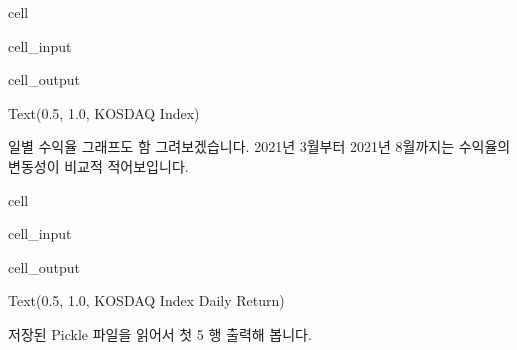 \documentclass[letterpaper,10pt,english]{jupyterBook}
\begin{document}
\begin{sphinxuseclass}{cell}
\begin{sphinxVerbatimInput}
\begin{sphinxuseclass}{cell_input}
\end{sphinxuseclass}\end{sphinxVerbatimInput}
\begin{sphinxVerbatimOutput}

\begin{sphinxuseclass}{cell_output}
\begin{sphinxVerbatim}[commandchars=\\\{\}]
Text(0.5, 1.0, \PYGZsq{}KOSDAQ Index\PYGZsq{})
\end{sphinxVerbatim}

\noindent{}

\end{sphinxuseclass}\end{sphinxVerbatimOutput}

\end{sphinxuseclass}
\sphinxAtStartPar
일별 수익율 그래프도 함 그려보겠습니다. 2021년 3월부터 2021년 8월까지는 수익율의 변동성이 비교적 적어보입니다.

\begin{sphinxuseclass}{cell}\begin{sphinxVerbatimInput}

\begin{sphinxuseclass}{cell_input}
\begin{sphinxVerbatim}[commandchars=\\\{\}]
\PYG{p}{[}\PYG{p}{]}  
\end{sphinxVerbatim}

\end{sphinxuseclass}\end{sphinxVerbatimInput}
\begin{sphinxVerbatimOutput}

\begin{sphinxuseclass}{cell_output}
\begin{sphinxVerbatim}[commandchars=\\\{\}]
Text(0.5, 1.0, \PYGZsq{}KOSDAQ Index Daily Return\PYGZsq{})
\end{sphinxVerbatim}

\noindent{}

\end{sphinxuseclass}\end{sphinxVerbatimOutput}

\end{sphinxuseclass}
\sphinxAtStartPar
저장된 Pickle 파일을 읽어서 첫 5 행 출력해 봅니다.
\end{document}
